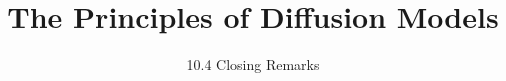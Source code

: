 ﻿%

\title{The Principles of Diffusion Models}
\subtitle{10.4 Closing Remarks}


\begin{frame}
    \titlepage
\end{frame}


